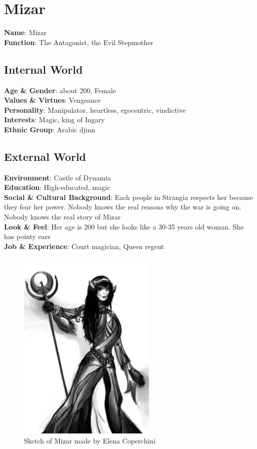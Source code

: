 \section{Mizar}

\begin{minipage}{0.5\textwidth}
\textbf{Name}: Mizar\\
\textbf{Function}: The Antagonist, the Evil Stepmother

\subsection{Internal World}

\textbf{Age \& Gender}: about 200, Female \\
\textbf{Values \& Virtues}: Vengeance \\
\textbf{Personality}: Manipulator, heartless, egocentric, vindictive \\
\textbf{Interests}: Magic, king of Ingary \\
\textbf{Ethnic Group}: Arabic djinn

\subsection{External World}
\textbf{Environment}: Castle of Dynamia \\
\textbf{Education}: High-educated, magic \\
\textbf{Social \& Cultural Background}: Each people in Strangia respects her because they fear her power. Nobody knows the real reasons why the war is going on. Nobody knows the real story of Mizar \\
\textbf{Look \& Feel}: Her age is 200 but she looks like a 30-35 years old woman. She has pointy ears  \\
\textbf{Job \& Experience}: Court magician, Queen regent \\

\end{minipage}%
%
\hfill\begin{minipage}{0.4\textwidth}
  \begin{figure}[H]
  \includegraphics{Images/Characters/mizar_portrait}
  \caption{Sketch of Mizar made by Elena Coperchini}
\end{figure}
\end{minipage}

